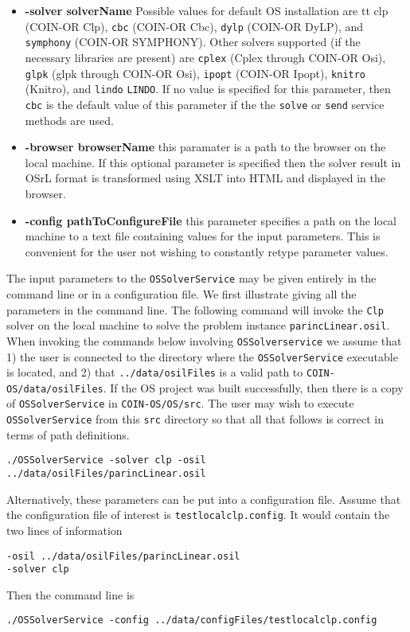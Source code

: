 \documentclass[11pt]{article}
\renewcommand{\_}{{\char"5F}}
\renewcommand{\{}{{\char"7B}}
\renewcommand{\}}{{\char"7D}}
\renewcommand{\^}{{\char"0D}}
\renewcommand{\'}{{\char"0D}}
\begin{document}
\begin{itemize}
\item[] {\bf -solver  solverName}  Possible values for default OS installation are {tt clp} (COIN-OR Clp), {\tt cbc} (COIN-OR Cbc), {\tt dylp} (COIN-OR DyLP), and {\tt symphony} (COIN-OR SYMPHONY). Other solvers supported (if the necessary libraries are present) are {\tt cplex} (Cplex through COIN-OR Osi), {\tt glpk} (glpk through COIN-OR Osi), {\tt ipopt} (COIN-OR Ipopt),  {\tt knitro} (Knitro), and {\tt lindo} {\tt LINDO}. If no value is specified for this parameter, then {\tt cbc} is the default value of this parameter if the the {\tt solve} or {\tt send} service methods are used.


\item[] {\bf -browser  browserName} this paramater is a path to the browser on the local machine. If this optional parameter is specified then the solver result in OSrL format is transformed using XSLT into HTML and displayed in the browser. 

\item[] {\bf -config pathToConfigureFile} this parameter specifies a path on the local machine to a text file containing values for the input parameters. This is convenient for the user not wishing to constantly retype parameter values.

\end{itemize}



The input parameters to the {\tt OSSolverService} may be given entirely in the command line or in a configuration file.  We first illustrate giving all the  parameters in the command line. The following command will invoke the {\tt Clp} solver on the local machine to solve the problem instance {\tt parincLinear.osil}.  When invoking the commands below involving {\tt OSSolverservice} we assume that 1) the user is connected to the directory where the {\tt OSSolverService} executable is located, and 2) that {\tt ../data/osilFiles} is a valid path to {\tt COIN-OS/data/osilFiles}.  If the OS project was built successfully, then there is a copy of  {\tt OSSolverService} in {\tt COIN-OS/OS/src}. The user may wish to execute {\tt OSSolverService} from this {\tt src} directory so that all that follows is correct in terms of path definitions.


\begin{verbatim}
./OSSolverService -solver clp -osil ../data/osilFiles/parincLinear.osil 
\end{verbatim}

Alternatively, these parameters can be put into a configuration file. Assume that the configuration file of interest is {\tt testlocalclp.config}. It would contain the two lines of information
\begin{verbatim}
-osil ../data/osilFiles/parincLinear.osil
-solver clp
\end{verbatim}
Then the command line is
\begin{verbatim}
./OSSolverService -config ../data/configFiles/testlocalclp.config
\end{verbatim}
\end{document}
